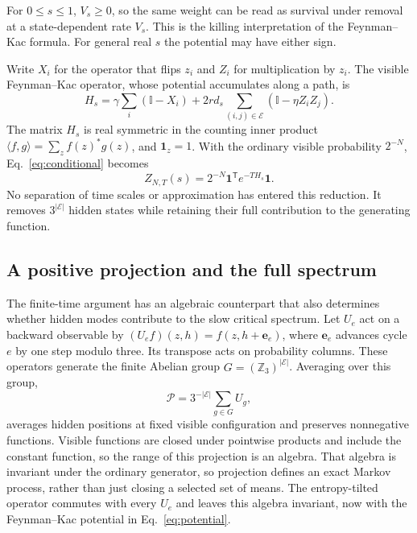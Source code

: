 \documentclass[aps,pre,reprint,amsmath,amssymb,longbibliography,floatfix]{revtex4-2}
\newcommand{\Id}{\mathbb I}
\begin{document}
For $0\le s\le1$, $V_s\ge0$, so the same weight can be read as survival
under removal at a state-dependent rate $V_s$. This is the killing
interpretation of the Feynman--Kac formula. For general real $s$ the
potential may have either sign.

Write $X_i$ for the operator that flips $z_i$ and $Z_i$ for multiplication
by $z_i$. The visible Feynman--Kac operator, whose potential accumulates
along a path, is
\begin{equation}
 H_s=\gamma\sum_i(\Id-X_i)+2r d_s\sum_{(i,j)\in\mathcal E}
 (\Id-\eta Z_i Z_j).
 \label{eq:H}
\end{equation}
The matrix $H_s$ is real symmetric in the counting inner product
$\langle f,g\rangle=\sum_z f(z)^*g(z)$, and $\mathbf1_z=1$.
With the ordinary visible probability $2^{-N}$,
Eq.~\eqref{eq:conditional} becomes
\begin{equation}
 Z_{N,T}(s)=2^{-N}\mathbf1^{\mathsf T}e^{-T H_s}\mathbf1.
 \label{eq:finiteT}
\end{equation}
No separation of time scales or approximation has entered this reduction.
It removes $3^{|\mathcal E|}$ hidden states while retaining their full
contribution to the generating function.

\subsection{A positive projection and the full spectrum}
The finite-time argument has an algebraic counterpart that also
determines whether hidden modes contribute to the slow critical spectrum.
Let $U_e$ act on a backward observable by
$(U_e f)(z,h)=f(z,h+\boldsymbol e_e)$, where $\boldsymbol e_e$ advances
cycle $e$ by one step modulo three. Its transpose acts on probability columns. These operators generate
the finite Abelian group $G=(\mathbb Z_3)^{|\mathcal E|}$. Averaging over
this group,
\begin{equation}
 \mathcal P=3^{-|\mathcal E|}\sum_{g\in G}U_g,
 \label{eq:projector}
\end{equation}
averages hidden positions at fixed visible configuration and preserves
nonnegative functions. Visible functions are closed under pointwise products and include the
constant function, so the range of this projection is an algebra. That algebra is invariant under
the ordinary generator, so projection defines an exact Markov process,
rather than just closing a selected set of means. The entropy-tilted operator commutes with every
$U_e$ and leaves this algebra invariant, now with the Feynman--Kac potential  
in Eq.~\eqref{eq:potential}.
\end{document}
